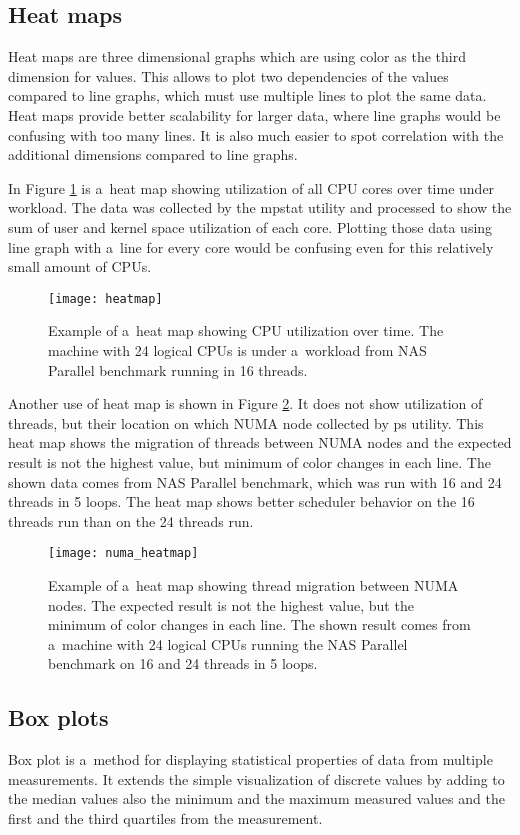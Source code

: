 \subsection{Heat maps}
Heat maps are three dimensional graphs which are using color as the third
dimension for values. This allows to plot two dependencies of the values
compared to line graphs, which must use multiple lines to plot the same data.
Heat maps provide better scalability for larger data, where line graphs would be
confusing with too many lines. It is also much easier to spot correlation
with the additional dimensions compared to line graphs.

In Figure \ref{fig:heatmap} is a~heat map showing utilization of all CPU cores over
time under workload. The data was collected by the mpstat utility and processed to
show the sum of user and kernel space utilization of each core. Plotting those data
using line graph with a~line for every core would be confusing even for this
relatively small amount of CPUs.

\begin{figure}
  \centering
  \texttt{[image: heatmap]}
  \caption{Example of a~heat map showing CPU utilization over time. The machine
    with 24 logical CPUs is under a~workload from NAS Parallel benchmark running
    in 16 threads.}
  \label{fig:heatmap}
\end{figure}

Another use of heat map is shown in Figure \ref{fig:numa_heatmap}. It does not
show utilization of threads, but their location on which NUMA node collected by
ps utility. This heat map shows the migration of threads between NUMA nodes and
the expected result is not the highest value, but minimum of color changes in
each line. The shown data comes from NAS Parallel benchmark, which was run with
16 and 24 threads in 5 loops. The heat map shows better scheduler behavior on
the 16 threads run than on the 24 threads run.

\begin{figure}
  \centering
  \texttt{[image: numa\_heatmap]}
  \caption{Example of a~heat map showing thread migration between NUMA nodes. The
    expected result is not the highest value, but the minimum of color changes in
    each line. The shown result comes from a~machine with 24 logical CPUs running
    the NAS Parallel benchmark on 16 and 24 threads in 5 loops.}
  \label{fig:numa_heatmap}
\end{figure}

\subsection{Box plots}
Box plot is a~method for displaying statistical properties of data from multiple
measurements. It extends the simple visualization of discrete values by adding
to the median values also the minimum and the maximum measured values and the
first and the third quartiles from the measurement.

